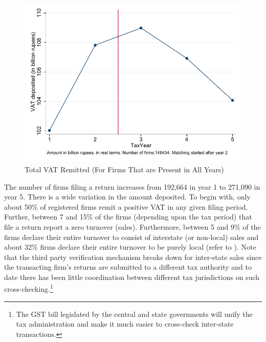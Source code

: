 
\begin{figure}[ht] 
\centering
\includegraphics[width=.7\textwidth]{graphs/TotalVATDeposited_TotalCount5_Real.pdf}
\caption{Total VAT Remitted (For Firms That are Present in All Years)}
\label{fig:vatdeposited-alwayspresent}
\end{figure}

The number of firms filing a return increases from 192,664 in year 1 to 271,090 in year 5. There is a wide variation in the amount deposited. To begin with, only about 50\% of registered firms remit a positive VAT in any given filing period. Further, between 7 and 15\% of the firms (depending upon the tax period) that file a return report a zero turnover (sales). Furthermore, between 5 and 9\% of the firms declare their entire turnover to consist of interstate (or non-local) sales and about 32\% firms declare their entire turnover to be purely local
(refer to ). Note that the third party verification mechanism breaks down for inter-state sales since the transacting firm's returns are submitted to a different tax authority and to date there has been little coordination between different tax jurisdictions on such cross-checking.\footnote{The GST bill legislated
by the central and state governments will unify the tax administration and make it much easier to cross-check inter-state transactions.} 

